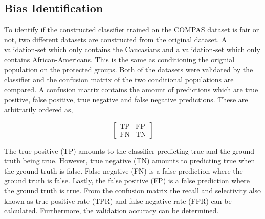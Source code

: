 \documentclass[11pt, fleqn, titlepage]{article}
\begin{document}
	
	\subsection{Bias Identification}\label{bias_id}
	To identify if the constructed classifier trained on the COMPAS dataset is fair or not, two different datasets are constructed from the original dataset. A validation-set which only contains the Caucasians and a validation-set which only contains African-Americans. This is the same as conditioning the orignial population on the protected groups. Both of the datasets were validated by the classifier and the confusion matrix of the two conditional populations are compared. A confusion matrix contains the amount of predictions which are true positive, false positive, true negative and false negative predictions. These are arbitrarily ordered as,
	
	\begin{figure}[h]	
			\begin{ceqn}
				\begin{equation*}
				\begin{bmatrix}
				\text{TP} & \text{FP}  \\
				\text{FN} & \text{TN} 
				\end{bmatrix} 
				\end{equation*} 
			\end{ceqn}
	\end{figure} \noindent
	The true positive (TP) amounts to the classifier predicting true and the ground truth being true. However, true negative (TN) amounts to predicting true when the ground truth is false. False negative (FN) is a false prediction where the ground truth is false. Lastly, the false positive (FP) is a false prediction where the ground truth is true. From the confusion matrix the recall and selectivity also known as true positive rate (TPR) and false negative rate (FPR) can be calculated. Furthermore, the validation accuracy can be determined.
	
\end{document}
